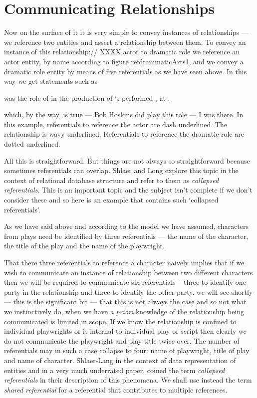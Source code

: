
\section{Communicating Relationships}
\mynote 
Now on the surface of it it is very simple
to convey instances of relationships --- we reference two entities and assert a relationship between them. 
To convey an instance of this relationship://
XXXX actor to dramatic role
we reference an actor entity, by name according to figure ref{drammaticArts1},
and we convey a dramatic role entity by means of five referentials as we have seen above.
In this way we get statements such as
\begin{erquote}

\parbox{9.0cm}{\linespread{1.5}\normalsize{} was  the role of  in the production of \mbox{'s}  performed \mbox{,} at .
}
\end{erquote}
which, by the way, is true  --- Bob Hoskins did play this role --- I was there.
In this example, referentials to reference the actor are dash underlined. The relationship is wavy underlined.
Referentials to reference the dramatic role are dotted underlined.

All this is straightforward. But things are not always so straightforward because sometimes referentials can overlap. 
Shlaer and Long explore this topic in the context of relational database structure and refer to them as \textit{collapsed referentials}. This is an important topic and the subject isn't complete if we don't 
consider these and so here is an example that contains such `collapsed referentials'.

As we have said above and according to the model we have assumed,
  characters from plays need be identified by three referentials
 --- the name of the character, the title of the play and the name of the playwright.

\mynote 
That there three referentials to reference a character naively implies that if we wish to communicate an instance of relationship between two different characters then we will be required to communicate six referentials
 -- three to identify one party in the relationship and three to identify the other party. 
 we will see shortly  --- this is the significant bit --- that this is not always the case and so not what we instinctively do, when we have \textit{a priori} knowledge of the relationship being communicated is limited in scope. 
 If we know the relationship is confined to individual playwrights or is internal to individual play 
 or script then clearly we do not 
  communicate the playwright and play title twice over. The number of referentials may in such a case collapse to four:
   name of playwright, title of play and name of character.
Shlaer-Lang in the context of data representation of entities and in a very much underrated paper, coined the term \textit{collapsed referentials} in
their description of this phenomena.  We shall use instead the term \textit{shared referential} for a referential that contributes to multiple references.

